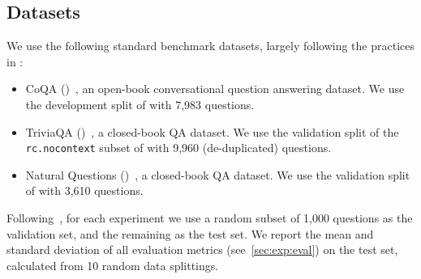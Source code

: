 \subsection{Datasets}


We use the following standard benchmark datasets, largely following the practices in \citet{kuhn2023semantic,lin2023generating}:
\begin{itemize}
    \item CoQA (\datasetcoqa)~\citep{reddy-etal-2019-coqa}, an open-book conversational question answering dataset. 
    We use the development split of \datasetcoqa with 7,983 questions.
    
    \item TriviaQA (\datasettrivia)~\citep{joshi-etal-2017-triviaqa}, a closed-book QA dataset.
    We use the validation split of the \texttt{rc.nocontext} subset of \datasettrivia with 9,960 (de-duplicated) questions. 

    \item Natural Questions (\datasetnqopen)~\citep{kwiatkowski-etal-2019-natural}, a closed-book QA dataset.
    We use the validation split of \datasetnqopen with 3,610 questions.
\end{itemize}
Following~\cite{lin2023generating}, for each experiment we use a random subset of 1,000 questions as the validation set, and the remaining as the test set. 
We report the mean and standard deviation of all evaluation metrics (see~\cref{sec:exp:eval}) on the test set, calculated from 10 random data splittings. 


